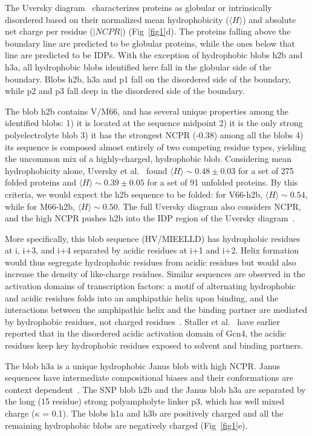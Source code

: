 \documentclass[10pt,letterpaper]{article}
\begin{document}
The Uversky diagram~\cite{Uversky2000a} characterizes proteins as globular or intrinsically disordered based on their normalized mean hydrophobicity ($\langle H \rangle$) and absolute net charge per residue ($|NCPR|$) (Fig~\ref{fig1}d). The proteins falling above the boundary line are predicted to be globular proteins, while the ones below that line are predicted to be IDPs. With the exception of hydrophobic blobs h2b and h3a, all hydrophobic blobs identified here fall in the globular side of the boundary. Blobs h2b, h3a and p1 fall on the disordered side of the boundary, while p2 and p3 fall deep in the disordered side of the boundary.

The blob h2b contains V/M66, and has several unique properties among the identified blobs: 1) it is located at the sequence midpoint 2) it is the only strong polyelectrolyte blob 3) it has the strongest NCPR (-0.38) among all the blobs 4) its sequence is composed almost entirely of two competing residue types, yielding the uncommon mix of a highly-charged, hydrophobic blob. Considering mean hydrophobicity alone, Uversky et al.~\cite{Uversky2000a} found $\langle H \rangle \sim 0.48 \pm{0.03}$ for a set of 275 folded proteins and $\langle H \rangle \sim 0.39 \pm{0.05}$ for a set of 91 unfolded proteins. By this criteria, we would expect the h2b sequence to be folded: for V66-h2b, $\langle H \rangle \sim 0.54$, while for M66-h2b, $\langle H \rangle\sim0.50$. The full Uversky diagram also considers NCPR, and the high NCPR pushes h2b into the IDP region of the Uversky diagram~\cite{Uversky2000a}. 

More specifically, this blob sequence (HV/MIEELLD) has hydrophobic residues at i, i+3, and i+4 separated by acidic residues at i+1 and i+2. Helix formation would thus segregate hydrophobic residues from acidic residues but would also increase the density of like-charge residues. Similar sequences are observed in the activation domains of transcription factors: a motif of alternating hydrophobic and acidic residues folds into an amphipathic helix upon binding, and the interactions between the amphipathic helix and the binding partner are mediated by hydrophobic residues, not charged residues~\cite{Brzovic2011,Uesugi1997, Radhakrishnan1997, Canales2017, Staller2018}. Staller et al.~\cite{Staller2018} have earlier reported that in the disordered acidic activation domain of Gcn4, the acidic residues keep key hydrophobic residues exposed to solvent and binding partners.

The blob h3a is a unique hydrophobic Janus blob with high NCPR. Janus sequences have intermediate compositional biases and their conformations are context dependent~\cite{Das2013, Das2015}. The SNP blob h2b and the Janus blob h3a are separated by the long (15 residue) strong polyampholyte linker p3, which has well mixed charge ($\kappa$ = 0.1). The blobs h1a and h3b are positively charged and all the remaining hydrophobic blobs are negatively charged (Fig~\ref{fig1}e).
\end{document}

